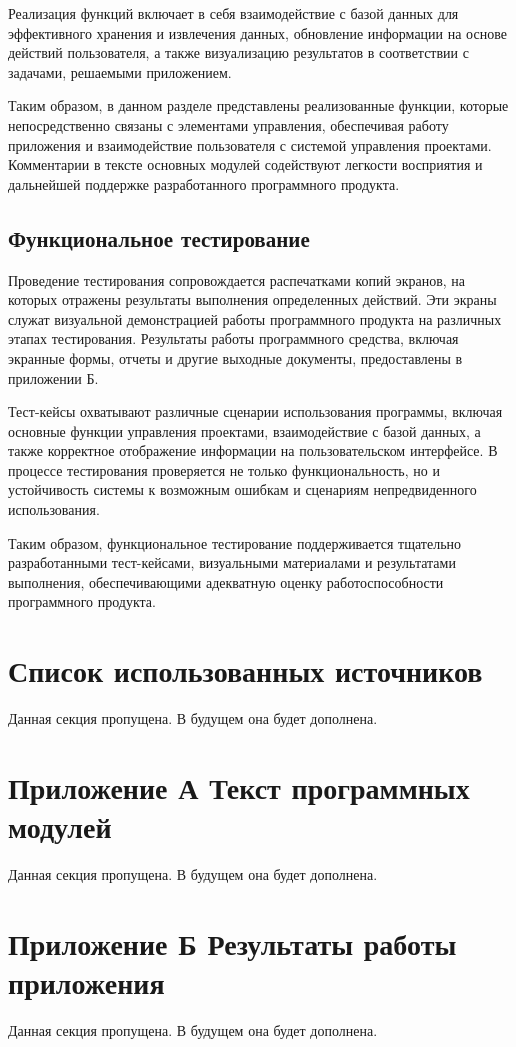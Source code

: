 \documentclass[12pt,a4paper,draft]{report}
\begin{document}
Реализация функций включает в себя взаимодействие с базой данных для эффективного хранения и извлечения данных, обновление информации на основе действий пользователя, а также визуализацию результатов в соответствии с задачами, решаемыми приложением.

Таким образом, в данном разделе представлены реализованные функции, которые непосредственно связаны с элементами управления, обеспечивая работу приложения и взаимодействие пользователя с системой управления проектами.
Комментарии в тексте основных модулей содействуют легкости восприятия и дальнейшей поддержке разработанного программного продукта.

\section{Функциональное тестирование}

Проведение тестирования сопровождается распечатками копий экранов, на которых отражены результаты выполнения определенных действий.
Эти экраны служат визуальной демонстрацией работы программного продукта на различных этапах тестирования.
Результаты работы программного средства, включая экранные формы, отчеты и другие выходные документы, предоставлены в приложении Б.

Тест-кейсы охватывают различные сценарии использования программы, включая основные функции управления проектами, взаимодействие с базой данных, а также корректное отображение информации на пользовательском интерфейсе.
В процессе тестирования проверяется не только функциональность, но и устойчивость системы к возможным ошибкам и сценариям непредвиденного использования.

Таким образом, функциональное тестирование поддерживается тщательно разработанными тест-кейсами, визуальными материалами и результатами выполнения, обеспечивающими адекватную оценку работоспособности программного продукта.

\chapter*{Список использованных источников}

Данная секция пропущена.
В будущем она будет дополнена.

\chapter*{Приложение А Текст программных модулей}

Данная секция пропущена.
В будущем она будет дополнена.

\chapter*{Приложение Б Результаты работы приложения}

Данная секция пропущена.
В будущем она будет дополнена.
\end{document}
